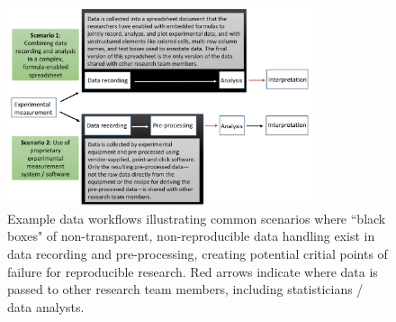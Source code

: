 \documentclass[pdftex,english,11pt,parskip=half]{scrartcl}
\begin{document}


\begin{figure}[h] 
\centering
\includegraphics[width = 0.8\textwidth]{figures/existing_blackboxes.jpg} 
\caption{Example data workflows illustrating common scenarios where ``black boxes" of non-transparent, non-reproducible data handling exist in data recording and pre-processing, creating potential
critial points of failure for reproducible research. Red arrows indicate where data is passed to other research team members, including statisticians / data analysts.} 
\label{fig:workflow} \end{figure}
\end{document}
